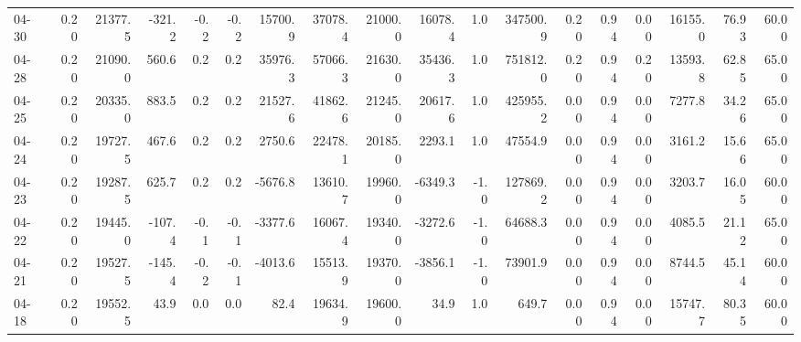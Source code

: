 \begin{threeparttable}
{\begin{tabular}{lrrrrrrrrrrrrrrrrr}
  04-30 &     0.20 & 21377.5 &            -321.2 &              -0.2 &               -0.2 &            15700.9 & 37078.4 & 21000.0 &    16078.4 &                      1.0 &            347500.9 &       0.20 &      0.94 &           0.00 &          16155.0 &           76.93 &                  60.00 \\
  04-28 &     0.20 & 21090.0 &             560.6 &               0.2 &                0.2 &            35976.3 & 57066.3 & 21630.0 &    35436.3 &                      1.0 &            751812.0 &       0.20 &      0.94 &           0.20 &          13593.8 &           62.85 &                  65.00 \\
  04-25 &     0.20 & 20335.0 &             883.5 &               0.2 &                0.2 &            21527.6 & 41862.6 & 21245.0 &    20617.6 &                      1.0 &            425955.2 &       0.00 &      0.94 &           0.00 &           7277.8 &           34.26 &                  65.00 \\
  04-24 &     0.20 & 19727.5 &             467.6 &               0.2 &                0.2 &             2750.6 & 22478.1 & 20185.0 &     2293.1 &                      1.0 &             47554.9 &       0.00 &      0.94 &           0.00 &           3161.2 &           15.66 &                  65.00 \\
  04-23 &     0.20 & 19287.5 &             625.7 &               0.2 &                0.2 &            -5676.8 & 13610.7 & 19960.0 &    -6349.3 &                     -1.0 &            127869.2 &       0.00 &      0.94 &           0.00 &           3203.7 &           16.05 &                  60.00 \\
  04-22 &     0.20 & 19445.0 &            -107.4 &              -0.1 &               -0.1 &            -3377.6 & 16067.4 & 19340.0 &    -3272.6 &                     -1.0 &             64688.3 &       0.00 &      0.94 &           0.00 &           4085.5 &           21.12 &                  65.00 \\
  04-21 &     0.20 & 19527.5 &            -145.4 &              -0.2 &               -0.1 &            -4013.6 & 15513.9 & 19370.0 &    -3856.1 &                     -1.0 &             73901.9 &       0.00 &      0.94 &           0.00 &           8744.5 &           45.14 &                  60.00 \\
  04-18 &     0.20 & 19552.5 &              43.9 &               0.0 &                0.0 &               82.4 & 19634.9 & 19600.0 &       34.9 &                      1.0 &               649.7 &       0.00 &      0.94 &           0.00 &          15747.7 &           80.35 &                  60.00 \\

\end{tabular}}
\end{threeparttable}
